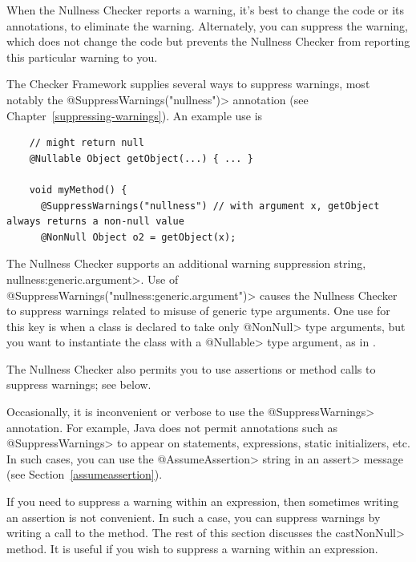 When the Nullness Checker reports a warning, it's best to change the code
or its annotations, to eliminate the warning.  Alternately, you can
suppress the warning, which does not change the code but prevents the
Nullness Checker from reporting this particular warning to you.

\begin{sloppypar}
The Checker Framework supplies several ways to suppress warnings, most
notably the \<@SuppressWarnings("nullness")> annotation (see
Chapter~\ref{suppressing-warnings}).  An example use is
\end{sloppypar}

\begin{smaller}
\begin{Verbatim}
    // might return null
    @Nullable Object getObject(...) { ... }

    void myMethod() {
      @SuppressWarnings("nullness") // with argument x, getObject always returns a non-null value
      @NonNull Object o2 = getObject(x);
\end{Verbatim}
\end{smaller}


The Nullness Checker supports an additional warning suppression string,
\<nullness:generic.argument>.
Use of \<@SuppressWarnings("nullness:generic.argument")> causes the Nullness
Checker to suppress warnings related to misuse of generic type
arguments.  One use for this key is when a class is declared to take only
\<@NonNull> type arguments, but you want to instantiate the class with a
\<@Nullable> type argument, as in .

The Nullness Checker also permits you to use assertions or method calls to
suppress warnings; see below.




Occasionally, it is inconvenient or
verbose to use the \<@SuppressWarnings> annotation.  For example, Java does
not permit annotations such as \<@SuppressWarnings> to appear on
statements, expressions, static initializers, etc.
In such cases, you can use the \<@AssumeAssertion> string in
an \<assert> message (see Section~\ref{assumeassertion}).

If you need to suppress a warning within an expression, then
sometimes writing an assertion is not convenient.  In such a case,
you can suppress warnings by writing a call to the
 method.
The rest of this section discusses the \<castNonNull> method.
It is useful if you wish to suppress a warning within an expression.

